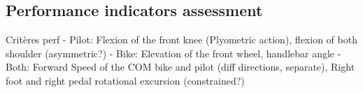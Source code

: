 







\subsection{Performance indicators assessment}
Critères perf
- Pilot: Flexion of the front knee (Plyometric action), flexion of both shoulder (asymmetric?)
- Bike: Elevation of the front wheel, handlebar angle
- Both: Forward Speed of the COM bike and pilot (diff directions, separate), Right foot and right pedal rotational excursion (constrained?) %


